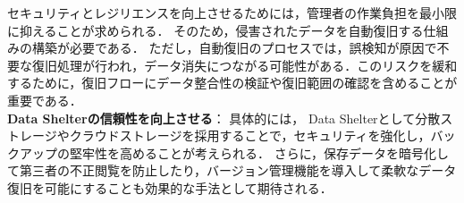 セキュリティとレジリエンスを向上させるためには，管理者の作業負担を最小限に抑えることが求められる．
そのため，侵害されたデータを自動復旧する仕組みの構築が必要である．
ただし，自動復旧のプロセスでは，誤検知が原因で不要な復旧処理が行われ，データ消失につながる可能性がある．このリスクを緩和するために，復旧フローにデータ整合性の検証や復旧範囲の確認を含めることが重要である．
\\
\textbf{Data Shelterの信頼性を向上させる}：
具体的には，
Data Shelterとして分散ストレージやクラウドストレージを採用することで，セキュリティを強化し，バックアップの堅牢性を高めることが考えられる．
さらに，保存データを暗号化して第三者の不正閲覧を防止したり，バージョン管理機能を導入して柔軟なデータ復旧を可能にすることも効果的な手法として期待される．
